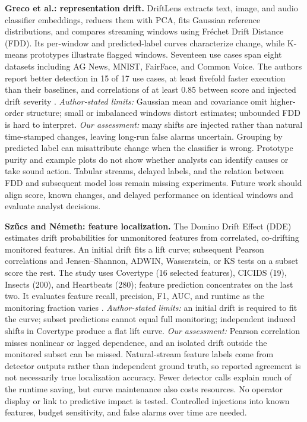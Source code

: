 \documentclass[10pt,a4paper]{article}
\begin{document}
\textbf{Greco et al.: representation drift.} DriftLens extracts text, image, and audio classifier embeddings, reduces them with PCA, fits Gaussian reference distributions, and compares streaming windows using Fr\'echet Drift Distance (FDD). Its per-window and predicted-label curves characterize change, while K-means prototypes illustrate flagged windows. Seventeen use cases span eight datasets including AG News, MNIST, FairFace, and Common Voice. The authors report better detection in 15 of 17 use cases, at least fivefold faster execution than their baselines, and correlations of at least 0.85 between score and injected drift severity \cite{greco}. \emph{Author-stated limits:} Gaussian mean and covariance omit higher-order structure; small or imbalanced windows distort estimates; unbounded FDD is hard to interpret. \emph{Our assessment:} many shifts are injected rather than natural time-stamped changes, leaving long-run false alarms uncertain. Grouping by predicted label can misattribute change when the classifier is wrong. Prototype purity and example plots do not show whether analysts can identify causes or take sound action. Tabular streams, delayed labels, and the relation between FDD and subsequent model loss remain missing experiments. Future work should align score, known changes, and delayed performance on identical windows and evaluate analyst decisions.

\textbf{Sz\H{u}cs and N\'emeth: feature localization.} The Domino Drift Effect (DDE) estimates drift probabilities for unmonitored features from correlated, co-drifting monitored features. An initial drift fits a lift curve; subsequent Pearson correlations and Jensen--Shannon, ADWIN, Wasserstein, or KS tests on a subset score the rest. The study uses Covertype (16 selected features), CICIDS (19), Insects (200), and Heartbeats (280); feature prediction concentrates on the last two. It evaluates feature recall, precision, F1, AUC, and runtime as the monitoring fraction varies \cite{szucs}. \emph{Author-stated limits:} an initial drift is required to fit the curve; subset predictions cannot equal full monitoring; independent induced shifts in Covertype produce a flat lift curve. \emph{Our assessment:} Pearson correlation misses nonlinear or lagged dependence, and an isolated drift outside the monitored subset can be missed. Natural-stream feature labels come from detector outputs rather than independent ground truth, so reported agreement is not necessarily true localization accuracy. Fewer detector calls explain much of the runtime saving, but curve maintenance also costs resources. No operator display or link to predictive impact is tested. Controlled injections into known features, budget sensitivity, and false alarms over time are needed.
\end{document}

